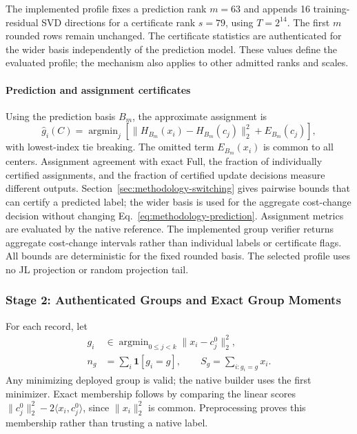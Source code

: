 The implemented profile fixes a prediction rank $m=63$ and appends 16
training-residual SVD directions for a certificate rank $s=79$, using
$T=2^{14}$. The first $m$ rounded rows remain unchanged. The certificate
statistics are authenticated for the wider basis independently of the
prediction model. These values define the evaluated profile; the mechanism
also applies to other admitted ranks and scales.

\paragraph{Prediction and assignment certificates}
Using the prediction basis $B_m$, the approximate assignment is
\begin{equation}
 \widehat g_i(C)=\mathop{\arg\min}_{j}
 \left[\|H_{B_m}(x_i)-H_{B_m}(c_j)\|_2^2
       +E_{B_m}(c_j)\right],
 \label{eq:methodology-prediction}
\end{equation}
with lowest-index tie breaking. The omitted term $E_{B_m}(x_i)$ is common
to all centers. Assignment agreement with exact Full, the fraction of
individually certified assignments, and the fraction of certified update
decisions measure different outputs. Section~\ref{sec:methodology-switching}
gives pairwise bounds that can certify a predicted label; the wider basis
is used for the aggregate cost-change decision without changing
Eq.~\eqref{eq:methodology-prediction}. Assignment metrics are evaluated by
the native reference. The implemented group verifier returns aggregate
cost-change intervals rather than individual labels or certificate flags.
All bounds are deterministic for the
fixed rounded basis. The selected profile uses no JL projection or random
projection tail.

\subsubsection{Stage 2: Authenticated Groups and Exact Group Moments}
\label{sec:methodology-groups}
For each record, let
\begin{equation}
 \begin{aligned}
 g_i&\in\mathop{\arg\min}_{0\leq j<k}\|x_i-c^0_j\|_2^2,\\
 n_g&=\sum_i\mathbf1[g_i=g],\qquad S_g=\sum_{i:g_i=g}x_i.
 \end{aligned}
 \label{eq:methodology-groups}
\end{equation}
Any minimizing deployed group is valid; the native builder uses the first
minimizer. Exact membership follows by comparing the linear scores
$\|c^0_j\|_2^2-2\langle x_i,c^0_j\rangle$, since $\|x_i\|_2^2$ is common.
Preprocessing proves this membership rather than trusting a native label.

